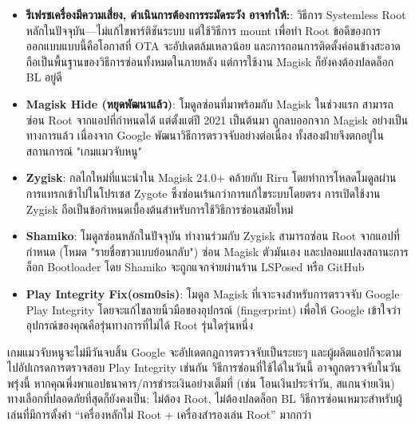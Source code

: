 \begin{itemize}
  \item \textbf{รีเฟรชเครื่องมีความเสี่ยง, ดำเนินการต้องการระมัดระวัง อาจทำให้:}: วิธีการ Systemless Root หลักในปัจจุบัน—ไม่แก้ไขพาร์ติชันระบบ แต่ใช้วิธีการ mount เพื่อทำ Root ข้อดีของการออกแบบแบบนี้คือโอกาสที่ OTA จะอัปเดตล้มเหลวน้อย และการถอนการติดตั้งค่อนข้างสะอาด ถือเป็นพื้นฐานของวิธีการซ่อนทั้งหมดในภายหลัง แต่การใช้งาน Magisk ก็ยังคงต้องปลดล็อก BL อยู่ดี
  \item \textbf{Magisk Hide (หยุดพัฒนาแล้ว)}: โมดูลซ่อนที่มาพร้อมกับ Magisk ในช่วงแรก สามารถซ่อน Root จากแอปที่กำหนดได้ แต่ตั้งแต่ปี 2021 เป็นต้นมา ถูกลบออกจาก Magisk อย่างเป็นทางการแล้ว เนื่องจาก Google พัฒนาวิธีการตรวจจับอย่างต่อเนื่อง ทั้งสองฝ่ายจึงตกอยู่ในสถานการณ์ "เกมแมวจับหนู"
  \item \textbf{Zygisk}: กลไกใหม่ที่แนะนำใน Magisk 24.0+ คล้ายกับ Riru โดยทำการโหลดโมดูลผ่านการแทรกเข้าไปในโปรเซส Zygote ซึ่งซ่อนเร้นกว่าการแก้ไขระบบโดยตรง การเปิดใช้งาน Zygisk ถือเป็นข้อกำหนดเบื้องต้นสำหรับการใช้วิธีการซ่อนสมัยใหม่
  \item \textbf{Shamiko}: โมดูลซ่อนหลักในปัจจุบัน ทำงานร่วมกับ Zygisk สามารถซ่อน Root จากแอปที่กำหนด (โหมด "รายชื่อขาวแบบย้อนกลับ") ซ่อน Magisk ตัวมันเอง และปลอมแปลงสถานะการล็อก Bootloader โดย Shamiko จะถูกแจกจ่ายผ่านร้าน LSPosed หรือ GitHub
  \item \textbf{Play Integrity Fix(osm0sis)}: โมดูล Magisk ที่เจาะจงสำหรับการตรวจจับ Google Play Integrity โดยจะแก้ไขลายนิ้วมือของอุปกรณ์ (fingerprint) เพื่อให้ Google เข้าใจว่าอุปกรณ์ของคุณคือรุ่นทางการที่ไม่ได้ Root รุ่นใดรุ่นหนึ่ง
\end{itemize}

\begin{tcbwarn}{เกมแมวจับหนูจะไม่มีวันจบสิ้น}
Google จะอัปเดตกฎการตรวจจับเป็นระยะๆ และผู้ผลิตแอปก็จะตามไปอัปเกรดการตรวจสอบ Play Integrity เช่นกัน วิธีการซ่อนที่ใช้ได้ในวันนี้ อาจถูกตรวจจับในวันพรุ่งนี้ หากคุณพึ่งพาแอปธนาคาร/การชำระเงินอย่างเต็มที่ (เช่น โอนเงินประจำวัน, สแกนจ่ายเงิน) ทางเลือกที่ปลอดภัยที่สุดก็ยังคงเป็น: ไม่ต้อง Root, ไม่ต้องปลดล็อก BL วิธีการซ่อนเหมาะสำหรับผู้เล่นที่มีการตั้งค่า “เครื่องหลักไม่ Root + เครื่องสำรองเล่น Root” มากกว่า

\end{tcbwarn}


